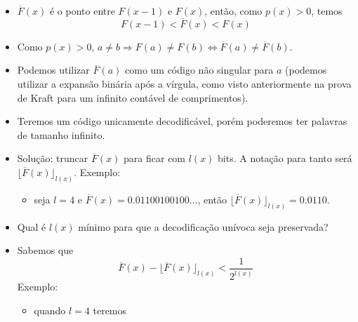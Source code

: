 \begin{frame}[allowframebreaks]
  \begin{itemize}
  \item $\overline{F}(x)$ é o ponto entre $F(x-1)$ e $F(x)$, então, como $p(x)>0$, temos
	\begin{equation}
	F(x-1) < \overline{F}(x) < F(x)
	\end{equation}
  \item Como $p(x)>0$, $a \neq b \Rightarrow F(a) \neq F(b) \Leftrightarrow \overline{F}(a) \neq \overline{F}(b)$.
  \item Podemos utilizar $\overline{F}(a)$ como um código não singular para $a$ (podemos utilizar a expansão binária após a vírgula,
	como visto anteriormente na prova de Kraft para um infinito contável de comprimentos).
  \item Teremos um código unicamente decodificável, porém poderemos ter palavras de tamanho infinito.
  \item Solução: truncar $\overline{F}(x)$ para ficar com $l(x)$ bits. A notação para tanto será $\lfloor \overline{F}(x) \rfloor_{l(x)}$.
	Exemplo:
	\begin{itemize}
	\item seja $l=4$ e $\overline{F}(x) = 0.01100100100\ldots$, então $\lfloor \overline{F}(x) \rfloor_{l(x)} = 0.0110$.
	\end{itemize}
  \item Qual é $l(x)$ mínimo para que a decodificação unívoca seja preservada?
  \item Sabemos que
	\begin{equation}
	\overline{F}(x) - \lfloor \overline{F}(x) \rfloor_{l(x)} < \frac{1}{2^{l(x)}}
	\end{equation}
	Exemplo:
	\begin{itemize}
        \item quando $l=4$ teremos \\
	\end{itemize}


\end{itemize}
\end{frame}
